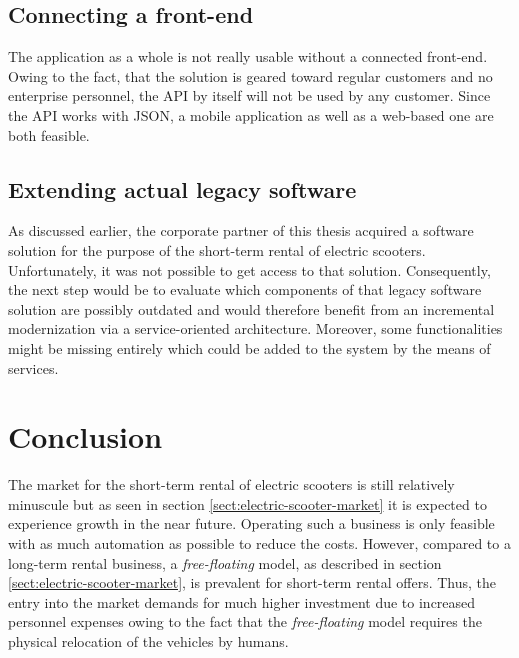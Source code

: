 \documentclass[12pt,a4paper,twoside]{report}
\begin{document}
\section{Connecting a front-end}

The application as a whole is not really usable without a connected front-end.
Owing to the fact, that the solution is geared toward regular customers
and no enterprise personnel, the API by itself will not be used by any customer.
Since the API works with JSON, a mobile application as well as a web-based one
are both feasible.


\section{Extending actual legacy software}

As discussed earlier, the corporate partner of this thesis acquired a
software solution for the purpose of the short-term rental of electric scooters.
Unfortunately, it was not possible to get access to that solution.
Consequently, the next step would be to evaluate which components of that
legacy software solution are possibly outdated and would therefore benefit
from an incremental modernization via a service-oriented architecture.
Moreover, some functionalities might be missing entirely which could be added
to the system by the means of services.



\chapter{Conclusion} \label{chap:conclusion}



The market for the short-term rental of electric scooters is still relatively
minuscule but as seen in section \ref{sect:electric-scooter-market} it is
expected to experience growth in the near future.
Operating such a business is only feasible with as much automation as possible
to reduce the costs. However, compared to a long-term rental business,
a \textit{free-floating} model, as described in section \ref{sect:electric-scooter-market},
is prevalent for short-term rental offers. Thus, the entry into the market
demands for much higher investment due to increased personnel expenses
owing to the fact that the \textit{free-floating} model requires
the physical relocation of the vehicles by humans.
\end{document}
